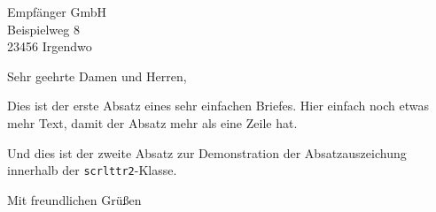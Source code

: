 \documentclass[privatbrief-1]{scrlttr2}
\begin{document}


\begin{letter}{
  Empfänger GmbH \\
  Beispielweg 8 \\
  23456 Irgendwo
}

\opening{Sehr geehrte Damen und Herren,}

Dies ist der erste Absatz eines sehr einfachen Briefes. Hier einfach noch etwas mehr Text, damit der Absatz mehr als eine Zeile hat.

Und dies ist der zweite Absatz zur Demonstration der Absatzauszeichung innerhalb der \texttt{scrlttr2}-Klasse.

\blindtext

\closing{Mit freundlichen Grüßen}

\end{letter}
\end{document}
